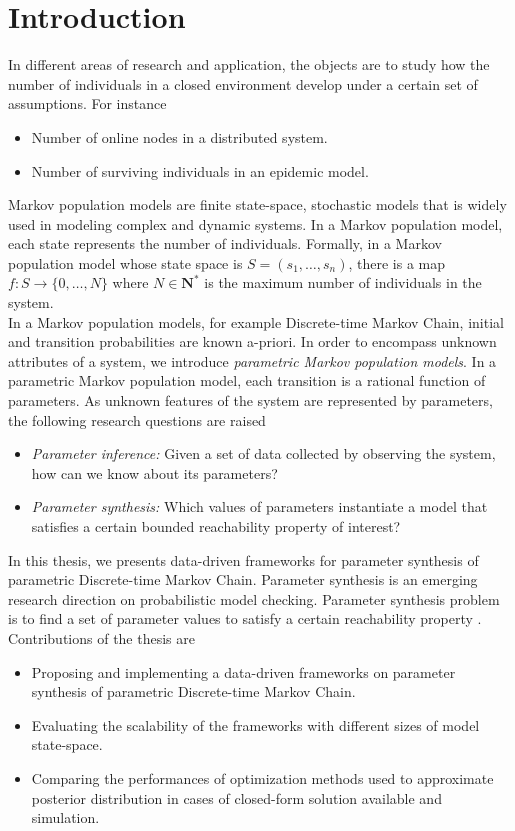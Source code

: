 \chapter{Introduction}
In different areas of research and application, the objects are to study how the number of
individuals in a closed environment develop under a certain set of assumptions. For instance
\begin{itemize}
      \item Number of online nodes in a distributed system.
      \item Number of surviving individuals in an epidemic model.
\end{itemize}
Markov population models \cite{kingman1969markov} are finite state-space, stochastic models that is
widely used in modeling complex and dynamic systems. In a Markov population model, each state
represents the number of individuals. Formally, in a Markov population model whose state space is
$S=(s_1,\ldots,s_n)$, there is a map $f:S\rightarrow\{0,\ldots,N\}$ where $N\in\mathbf{N}^*$ is the
maximum number of individuals in the system.\\
In a Markov population models, for example Discrete-time Markov Chain, initial and transition
probabilities are known a-priori. In order to encompass unknown attributes of a system, we introduce
\textit{parametric Markov population models}. In a parametric Markov population model, each
transition is a rational function of parameters. As unknown features of the system are represented
by parameters, the following research questions are raised
\begin{itemize}
      \item \textit{Parameter inference:} Given a set of data collected by observing the system, how
            can we know about its parameters?
      \item \textit{Parameter synthesis:} Which values of parameters instantiate a model that
            satisfies a certain bounded reachability property of interest?
\end{itemize}
In this thesis, we presents data-driven frameworks for parameter synthesis of parametric
Discrete-time Markov Chain. Parameter synthesis is an emerging research direction on probabilistic
model checking. Parameter synthesis problem is to find a set of parameter values to satisfy a
certain reachability property \cite{katoen2016probabilistic}. Contributions of the thesis are
\begin{itemize}
      \item Proposing and implementing a data-driven frameworks on parameter synthesis of parametric
            Discrete-time Markov Chain.
      \item Evaluating the scalability of the frameworks with different sizes of model state-space.
      \item Comparing the performances of optimization methods used to approximate posterior
            distribution in cases of closed-form solution available and simulation.
\end{itemize}

